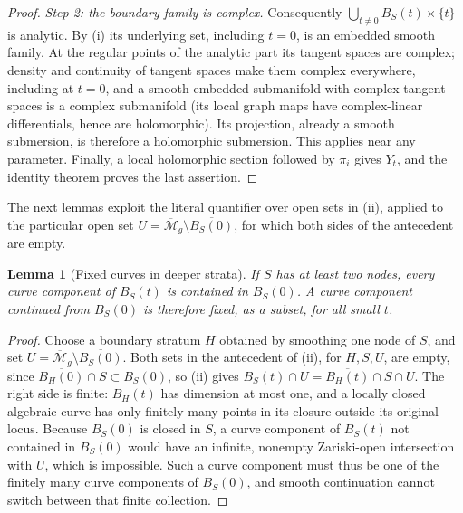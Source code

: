 \documentclass[11pt]{article}
\newcommand{\M}{\mathcal M}
\newcommand{\cl}[1]{\overline{#1}}
\newtheorem{lemma}[theorem]{Lemma}
\theoremstyle{remark}
\begin{document}
\begin{proof}
\emph{Step 2: the boundary family is complex.}
Consequently \(\bigcup_{t\ne0}B_S(t)\times\{t\}\) is analytic.
By (i) its underlying set, including \(t=0\), is an embedded
smooth family. At the regular points of the analytic part its
tangent spaces are complex; density and continuity of tangent
spaces make them complex everywhere, including at \(t=0\), and
a smooth embedded submanifold with complex tangent spaces
is a complex submanifold (its local graph maps have complex-linear
differentials, hence are holomorphic).
Its projection, already a smooth submersion, is therefore
a holomorphic submersion. This applies near any parameter.
Finally, a local holomorphic section followed by \(\pi_i\) gives
\(Y_t\), and the identity theorem proves the last assertion.
\end{proof}

The next lemmas exploit the literal quantifier over open sets in
(ii), applied to the particular open set
\(U=\cl{\M}_g\setminus\cl{B_S(0)}\), for which both sides of the
antecedent are empty.

\begin{lemma}[Fixed curves in deeper strata]\label{lem:deep}
If \(S\) has at least two nodes, every curve component of \(B_S(t)\)
is contained in \(B_S(0)\). A curve component continued from
\(B_S(0)\) is therefore fixed, as a subset, for all small \(t\).
\end{lemma}

\begin{proof}
Choose a boundary stratum \(H\) obtained by smoothing one node of
\(S\), and set \(U=\cl{\M}_g\setminus\cl{B_S(0)}\).
Both sets in the antecedent of (ii), for \(H,S,U\), are empty, since
\(\cl{B_H(0)}\cap S\subset B_S(0)\), so (ii) gives
\(B_S(t)\cap U=\cl{B_H(t)}\cap S\cap U\).
The right side is finite: \(B_H(t)\) has dimension at most
one, and a locally closed algebraic curve has only finitely many
points in its closure outside its original locus.
Because \(B_S(0)\) is closed in \(S\), a curve component of \(B_S(t)\)
not contained in \(B_S(0)\) would have an infinite, nonempty
Zariski-open intersection with \(U\), which is impossible. Such a
curve component must thus be one of the finitely many curve
components of \(B_S(0)\), and smooth continuation cannot switch
between that finite collection.
\end{proof}
\end{document}

